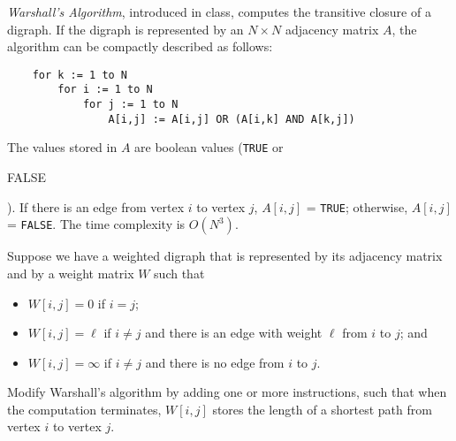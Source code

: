 {\em Warshall's Algorithm}, introduced in class, computes the transitive
closure of a digraph. If the digraph is represented by an $N \times  N$
adjacency matrix $A$, the algorithm can be compactly described as
follows:

\begin{verbatim}
    for k := 1 to N
        for i := 1 to N
            for j := 1 to N
                A[i,j] := A[i,j] OR (A[i,k] AND A[k,j])
\end{verbatim}

The values stored in $A$ are boolean values ({\tt TRUE} or {\tt

FALSE}).  If there is an edge from vertex $i$ to vertex $j$, $A[i,j]$ =
{\tt TRUE}; otherwise, $A[i,j]$ = {\tt FALSE}.  The time complexity is
$O(N^3)$.

\indent
Suppose we have a weighted digraph that is represented by its
adjacency matrix and by a weight matrix $W$ such that

\begin{itemize}

\item  $W[i,j] = 0$ if $i=j$;

\item  $W[i,j] = \ell$  if $i\neq  j$ and there is an edge with weight
$\ell$  from $i$ to $j$; and

\item  $W[i,j] = \infty$  if $i\neq  j$ and there is no edge from  $i$ to
$j$.

\end{itemize}

Modify Warshall's algorithm by adding one or more instructions, such
that when the computation terminates, $W[i,j]$ stores the length of a
shortest path from vertex $i$ to vertex $j$.
